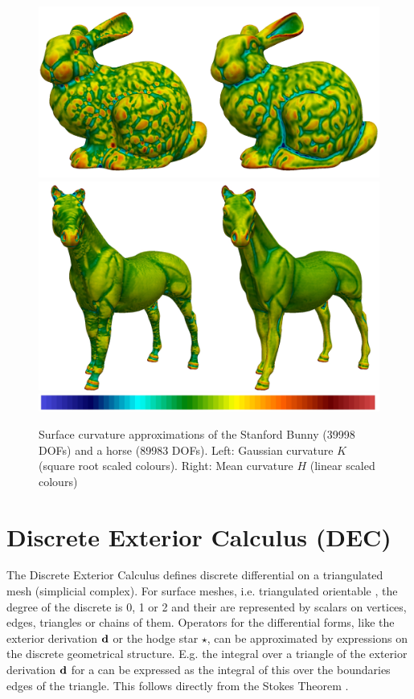   
  \begin{figure}
    \centering\includegraphics[width=.45\textwidth]{bilder/bunnyCurvature.jpg}
    \centering\includegraphics[width=.45\textwidth]{bilder/horseCurvature.jpg}
    \centering\includegraphics[width=.45\textwidth]{bilder/colourBar.jpg}
    \caption{Surface curvature approximations of the Stanford Bunny (39998 DOFs) and a horse (89983 DOFs).
             Left: Gaussian curvature \( K \) (square root scaled colours).
             Right: Mean curvature \( H \) (linear scaled colours)}
    \label{figBunnyHorseCurvature}
  \end{figure}


\section{Discrete Exterior Calculus (DEC)}
  The Discrete Exterior Calculus \citep{hirani, desbrun} defines discrete differential  on a triangulated mesh (simplicial complex).
  For surface meshes, i.e. triangulated orientable , the degree of the discrete  is 0, 1 or 2
  and their are represented by scalars on vertices, edges, triangles or chains of them. 
  Operators for the differential forms, like the exterior derivation \( \mathbf{d} \) or the hodge star \( \star \), can be approximated by expressions on the discrete
  geometrical structure. 
  E.g. the integral over a triangle of the exterior derivation \( \mathbf{d} \) for a  can be expressed as the integral of this
   over the boundaries edges of the triangle. 
  This follows directly from the Stokes Theorem \citep[Ch. 7]{marsden}. 
 
